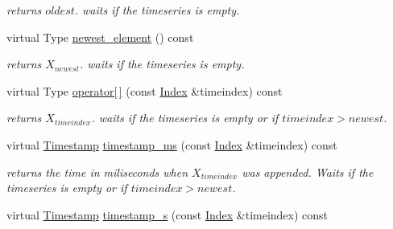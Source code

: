 \begin{DoxyCompactItemize}
\begin{DoxyCompactList}\small\item\em returns $ oldest $. waits if the timeseries is empty. \end{DoxyCompactList}\item 
virtual Type \hyperlink{classreal__time__tools_1_1ThreadsafeTimeseries_a287dbff07cc90e36a41dde73466314a9}{newest\+\_\+element} () const \hypertarget{classreal__time__tools_1_1ThreadsafeTimeseries_a287dbff07cc90e36a41dde73466314a9}{}\label{classreal__time__tools_1_1ThreadsafeTimeseries_a287dbff07cc90e36a41dde73466314a9}

\begin{DoxyCompactList}\small\item\em returns $ X_{newest} $. waits if the timeseries is empty. \end{DoxyCompactList}\item 
virtual Type \hyperlink{classreal__time__tools_1_1ThreadsafeTimeseries_aeaeb6428ee3190538a8e82b525ec0f87}{operator\mbox{[}$\,$\mbox{]}} (const \hyperlink{classreal__time__tools_1_1ThreadsafeTimeseries_a9364696c534468d7ad927883b16ca981}{Index} \&timeindex) const \hypertarget{classreal__time__tools_1_1ThreadsafeTimeseries_aeaeb6428ee3190538a8e82b525ec0f87}{}\label{classreal__time__tools_1_1ThreadsafeTimeseries_aeaeb6428ee3190538a8e82b525ec0f87}

\begin{DoxyCompactList}\small\item\em returns $ X_{timeindex} $. waits if the timeseries is empty or if $timeindex > newest $. \end{DoxyCompactList}\item 
virtual \hyperlink{classreal__time__tools_1_1ThreadsafeTimeseries_a41e36f99889a580ce56491e573fa77b0}{Timestamp} \hyperlink{classreal__time__tools_1_1ThreadsafeTimeseries_a2014a6970029b85598d8d4b08b501832}{timestamp\+\_\+ms} (const \hyperlink{classreal__time__tools_1_1ThreadsafeTimeseries_a9364696c534468d7ad927883b16ca981}{Index} \&timeindex) const \hypertarget{classreal__time__tools_1_1ThreadsafeTimeseries_a2014a6970029b85598d8d4b08b501832}{}\label{classreal__time__tools_1_1ThreadsafeTimeseries_a2014a6970029b85598d8d4b08b501832}

\begin{DoxyCompactList}\small\item\em returns the time in miliseconds when $ X_{timeindex} $ was appended. Waits if the timeseries is empty or if $timeindex > newest $. \end{DoxyCompactList}\item 
virtual \hyperlink{classreal__time__tools_1_1ThreadsafeTimeseries_a41e36f99889a580ce56491e573fa77b0}{Timestamp} \hyperlink{classreal__time__tools_1_1ThreadsafeTimeseries_adec397db4b4568f6b3369105122cc919}{timestamp\+\_\+s} (const \hyperlink{classreal__time__tools_1_1ThreadsafeTimeseries_a9364696c534468d7ad927883b16ca981}{Index} \&timeindex) const \hypertarget{classreal__time__tools_1_1ThreadsafeTimeseries_adec397db4b4568f6b3369105122cc919}{}\label{classreal__time__tools_1_1ThreadsafeTimeseries_adec397db4b4568f6b3369105122cc919}


\end{DoxyCompactItemize}
